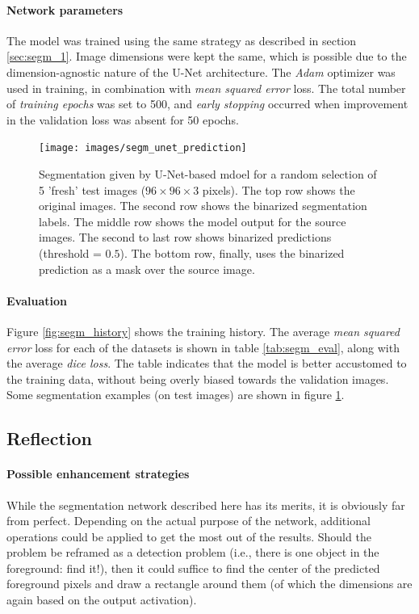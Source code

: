 \paragraph{Network parameters} The model was trained using the same strategy as described in section \ref{sec:segm_1}. Image dimensions were kept the same, which is possible due to the dimension-agnostic nature of the U-Net architecture. The \textit{Adam} optimizer was used in training, in combination with \textit{mean squared error} loss. The total number of \textit{training epochs} was set to 500, and \textit{early stopping} occurred when improvement in the validation loss was absent for 50 epochs.

\begin{figure}[!htbp]
  \begin{center}
    \texttt{[image: images/segm\_unet\_prediction]}
    \caption{Segmentation given by U-Net-based mdoel for a random selection of 5 'fresh' test images ($96\times96\times3$ pixels). The top row shows the original images. The second row shows the binarized segmentation labels. The middle row shows the model output for the source images. The second to last row shows binarized predictions (threshold = $0.5$). The bottom row, finally, uses the binarized prediction as a mask over the source image.}
    \label{fig:segm_unet_prediction}
  \end{center}
\end{figure}

\paragraph{Evaluation} Figure \textcolor{blue}{\ref{fig:segm_history}} shows the training history. The average \textit{mean squared error} loss for each of the datasets is shown in table \textcolor{blue}{\ref{tab:segm_eval}}, along with the average \textit{dice loss}. The table indicates that the model is better accustomed to the training data, without being overly biased towards the validation images. Some segmentation examples (on test images) are shown in figure \ref{fig:segm_unet_prediction}.



\subsection{Reflection}

\paragraph{Possible enhancement strategies} While the segmentation network described here has its merits, it is obviously far from perfect. Depending on the actual purpose of the network, additional operations could be applied to get the most out of the results. Should the problem be reframed as a detection problem (i.e., there is one object in the foreground: find it!), then it could suffice to find the center of the predicted foreground pixels and draw a rectangle around them (of which the dimensions are again based on the output activation).

